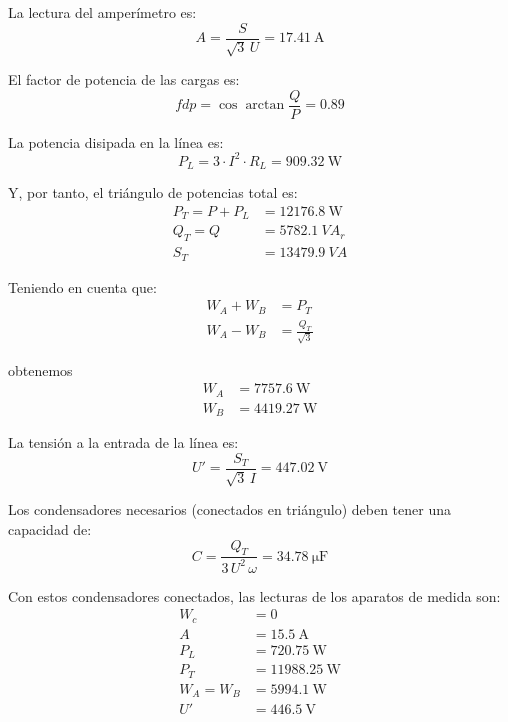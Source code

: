 La lectura del amperímetro es:
\begin{equation*}
  A = \frac{S}{\sqrt{3} \,U} = \SI{17.41}{\ampere}
\end{equation*}

El factor de potencia de las cargas es:
\begin{equation*}
  fdp = \cos{\arctan{\frac{Q}{P}}} = 0.89
\end{equation*}

La potencia disipada en la línea es:
\begin{equation*}
  P_L = 3 \cdot I^2 \cdot R_L = \SI{909.32}{\watt}
\end{equation*}

Y, por tanto, el triángulo de potencias total es:
\begin{align*}
  P_T = P + P_L &= \SI{12176.8}{\watt}\\
  Q_T = Q &= \SI{5782.1}{VA}_r\\
  S_T &= \SI{13479.9}{VA}
\end{align*}

Teniendo en cuenta que:
\begin{align*}
  W_A + W_B &= P_T\\
  W_A - W_B &= \frac{Q_T}{\sqrt{3}}
\end{align*}

obtenemos
\begin{align*}
  W_A &= \SI{7757.6}{\watt}\\
  W_B &= \SI{4419.27}{\watt}
\end{align*}

La tensión a la entrada de la línea es:
\begin{equation*}
  U' = \frac{S_T}{\sqrt{3} \,I} = \SI{447.02}{\volt}
\end{equation*}

Los condensadores necesarios (conectados en triángulo) deben tener una
capacidad de:
\begin{equation*}
  C = \frac{Q_T}{3 \,U^2 \,\omega} = \SI{34.78}{\micro\farad}
\end{equation*}

Con estos condensadores conectados, las lecturas de los aparatos de
medida son:
\begin{align*}
  W_c &= 0\\
  A &= \SI{15.5}{\ampere}\\
  P_L &= \SI{720.75}{\watt}\\
  P_T &= \SI{11988.25}{\watt}\\
  W_A = W_B &= \SI{5994.1}{\watt}\\
  U' &= \SI{446.5}{\volt}\\  
\end{align*}



